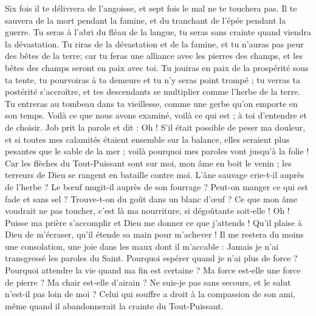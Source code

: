 \begin{multicols}{2}
Six fois il te délivrera de l'angoisse, et sept fois le mal ne te touchera pas.
Il te sauvera de la mort pendant la famine, et du tranchant de l'épée pendant la guerre.
Tu seras à l'abri du fléau de la langue, tu seras sans crainte quand viendra la dévastation.
Tu riras de la dévastation et de la famine, et tu n'auras pas peur des bêtes de la terre;
car tu feras une alliance avec les pierres des champs, et les bêtes des champs seront en paix avec toi.
Tu jouiras en paix de la prospérité sous ta tente, tu pourvoiras à ta demeure et tu n'y seras point trompé ;
tu verras ta postérité s'accroître, et tes descendants se multiplier comme l'herbe de la terre.
Tu entreras au tombeau dans ta vieillesse, comme une gerbe qu'on emporte en son temps.
Voilà ce que nous avons examiné, voilà ce qui est ; à toi d'entendre et de choisir.
\VerseOne{}Job prit la parole et dit :
Oh ! S'il était possible de peser ma douleur, et si toutes mes calamités étaient ensemble sur la balance,
elles seraient plus pesantes que le sable de la mer ; voilà pourquoi mes paroles vont jusqu'à la folie !
Car les flèches du Tout-Puissant sont sur moi, mon âme en boit le venin ; les terreurs de Dieu se rangent en bataille contre moi.
L'âne sauvage crie-t-il auprès de l'herbe ? Le bœuf mugit-il auprès de son fourrage ?
Peut-on manger ce qui est fade et sans sel ? Trouve-t-on du goût dans un blanc d'œuf ?
Ce que mon âme voudrait ne pas toucher, c'est là ma nourriture, si dégoûtante soit-elle !
Oh ! Puisse ma prière s'accomplir et Dieu me donner ce que j'attends !
Qu'il plaise à Dieu de m'écraser, qu'il étende sa main pour m'achever !
Il me restera du moins une consolation, une joie dans les maux dont il m'accable : Jamais je n'ai transgressé les paroles du Saint.
Pourquoi espérer quand je n'ai plus de force ? Pourquoi attendre la vie quand ma fin est certaine ?
Ma force est-elle une force de pierre ? Ma chair est-elle d'airain ?
Ne suis-je pas sans secours, et le salut n'est-il pas loin de moi ?
Celui qui souffre a droit à la compassion de son ami, même quand il abandonnerait la crainte du Tout-Puissant.

\end{multicols}
